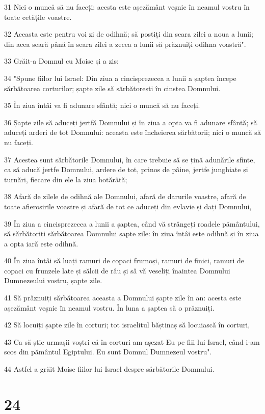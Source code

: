 \par 31 Nici o muncă să nu faceți: acesta este așezământ veșnic în neamul vostru în toate cetățile voastre.
\par 32 Aceasta este pentru voi zi de odihnă; să postiți din seara zilei a noua a lunii; din acea seară până în seara zilei a zecea a lunii să prăznuiți odihna voastră".
\par 33 Grăit-a Domnul cu Moise și a zis:
\par 34 "Spune fiilor lui Israel: Din ziua a cincisprezecea a lunii a șaptea începe sărbătoarea corturilor; șapte zile să sărbătorești în cinstea Domnului.
\par 35 În ziua întâi va fi adunare sfântă; nici o muncă să nu faceți.
\par 36 Șapte zile să aduceți jertfă Domnului și în ziua a opta va fi adunare sfântă; să aduceți arderi de tot Domnului: aceasta este încheierea sărbătorii; nici o muncă să nu faceți.
\par 37 Acestea sunt sărbătorile Domnului, în care trebuie să se țină adunările sfinte, ca să aducă jertfe Domnului, ardere de tot, prinos de pâine, jertfe junghiate și turnări, fiecare din ele la ziua hotărâtă;
\par 38 Afară de zilele de odihnă ale Domnului, afară de darurile voastre, afară de toate afierosirile voastre și afară de tot ce aduceți din evlavie și dați Domnului,
\par 39 În ziua a cincisprezecea a lunii a șaptea, când vă strângeți roadele pământului, să sărbătoriți sărbătoarea Domnului șapte zile: în ziua întâi este odihnă și în ziua a opta iară este odihnă.
\par 40 În ziua întâi să luați ramuri de copaci frumoși, ramuri de finici, ramuri de copaci cu frunzele late și sălcii de râu și să vă veseliți înaintea Domnului Dumnezeului vostru, șapte zile.
\par 41 Să prăznuiți sărbătoarea aceasta a Domnului șapte zile în an: acesta este așezământ veșnic în neamul vostru. În luna a șaptea să o prăznuiți.
\par 42 Să locuiți șapte zile în corturi; tot israelitul băștinaș să locuiască în corturi,
\par 43 Ca să știe urmașii voștri că în corturi am așezat Eu pe fiii lui Israel, când i-am scos din pământul Egiptului. Eu sunt Domnul Dumnezeul vostru".
\par 44 Astfel a grăit Moise fiilor lui Israel despre sărbătorile Domnului.

\chapter{24}

